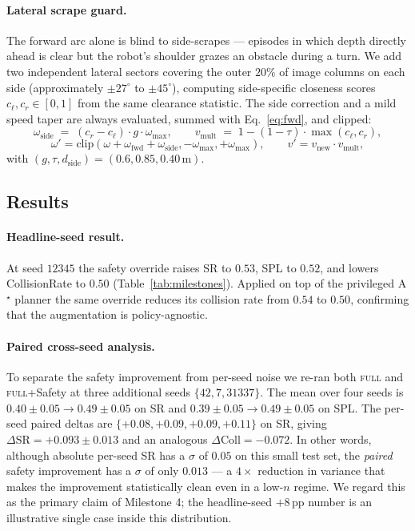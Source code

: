 \documentclass[11pt,a4paper]{article}
\begin{document}
\paragraph{Lateral scrape guard.} The forward arc alone is blind to
side-scrapes --- episodes in which depth directly ahead is clear but
the robot's shoulder grazes an obstacle during a turn. We add two
independent lateral sectors covering the outer $20\%$ of image columns
on each side (approximately $\pm 27^\circ$ to $\pm 45^\circ$),
computing side-specific closeness scores $c_\ell,c_r\in[0,1]$ from the
same clearance statistic. The side correction and a mild speed taper
are always evaluated, summed with Eq.~\ref{eq:fwd}, and clipped:
\begin{equation}
\omega_{\text{side}} \;=\; (c_r-c_\ell)\cdot g\cdot \omega_{\max},
\qquad
v_{\text{mult}} \;=\; 1-(1-\tau)\cdot\max(c_\ell,c_r),
\end{equation}
\begin{equation}
\omega' = \mathrm{clip}(\omega + \omega_{\text{fwd}} + \omega_{\text{side}}, -\omega_{\max}, +\omega_{\max}),
\qquad
v' = v_{\text{new}}\cdot v_{\text{mult}},
\end{equation}
with $(g,\tau,d_{\text{side}})=(0.6,0.85,0.40\,\text{m})$.

\subsection{Results}

\paragraph{Headline-seed result.} At seed $12345$ the safety override
raises SR to $\mathbf{0.53}$, SPL to $\mathbf{0.52}$, and lowers
CollisionRate to $\mathbf{0.50}$
(Table~\ref{tab:milestones}). Applied on top of the privileged
A$^\star$ planner the same override reduces its collision rate from
$0.54$ to $0.50$, confirming that the augmentation is policy-agnostic.

\paragraph{Paired cross-seed analysis.} To separate the safety
improvement from per-seed noise we re-ran both \textsc{full} and
\textsc{full}+Safety at three additional seeds $\{42,7,31337\}$. The
mean over four seeds is $0.40\pm 0.05 \to 0.49\pm 0.05$ on SR and
$0.39\pm 0.05 \to 0.49\pm 0.05$ on SPL. The per-seed paired deltas are
$\{+0.08,+0.09,+0.09,+0.11\}$ on SR, giving
$\Delta\text{SR}=\mathbf{+0.093\pm 0.013}$ and an analogous
$\Delta\text{Coll}=-0.072$. In other words, although absolute per-seed
SR has a $\sigma$ of $0.05$ on this small test set, the \emph{paired}
safety improvement has a $\sigma$ of only $0.013$ --- a
$4\times$ reduction in variance that makes the improvement
statistically clean even in a low-$n$ regime. We regard this as the
primary claim of Milestone 4; the headline-seed $+8$\,pp number is an
illustrative single case inside this distribution.
\end{document}
